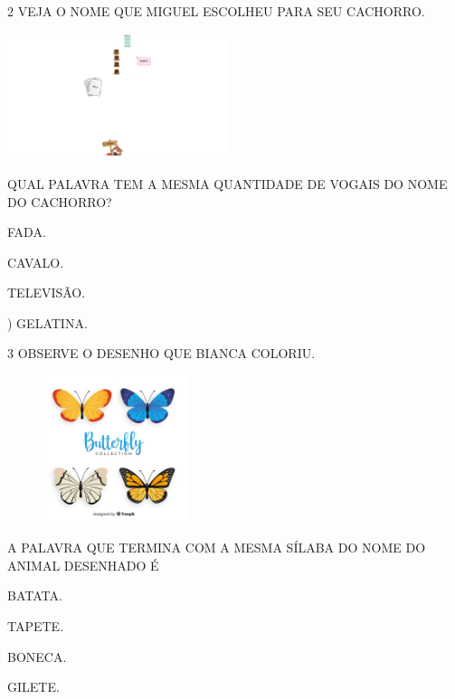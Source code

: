 \num{2} VEJA O NOME QUE MIGUEL ESCOLHEU PARA SEU CACHORRO. 

\includegraphics[width=2.53194in,height=1.44514in]{media/image226.png}


QUAL PALAVRA TEM A MESMA QUANTIDADE DE VOGAIS DO NOME DO CACHORRO?

\begin{escolha}
\item FADA.

\item CAVALO.

\item TELEVISÃO.

\item) GELATINA.
\end{escolha}

\num{3} OBSERVE O DESENHO QUE BIANCA COLORIU.

\includegraphics[width=2.45833in,height=1.69432in]{media/image227.png}


A PALAVRA QUE TERMINA COM A MESMA SÍLABA DO NOME DO ANIMAL DESENHADO É

\begin{escolha}
\item BATATA.

\item TAPETE.

\item BONECA.

\item GILETE.
\end{escolha}

